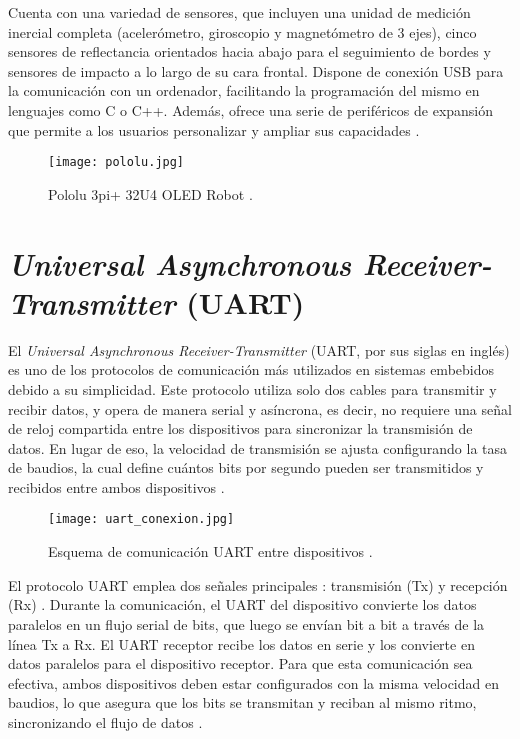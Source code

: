 Cuenta con una variedad de sensores, que incluyen una unidad de medición inercial completa (acelerómetro, giroscopio y magnetómetro de 3 ejes), cinco sensores de reflectancia orientados hacia abajo para el seguimiento de bordes y sensores de impacto a lo largo de su cara frontal. Dispone de conexión USB para la comunicación con un ordenador, facilitando la programación del mismo en lenguajes como C o C++. Además, ofrece una serie de periféricos de expansión que permite a los usuarios personalizar y ampliar sus capacidades \cite{pololu}.
\begin{figure}[H]
	\centering
	\texttt{[image: pololu.jpg]}
	\caption{Pololu 3pi+ 32U4 OLED Robot \cite{pololu}.}
	\label{fig:pololu}
\end{figure}

\section{\textit{Universal Asynchronous Receiver-Transmitter} (UART)}

El \textit{Universal Asynchronous Receiver-Transmitter} (UART, por sus siglas en inglés) es uno de los protocolos de comunicación más utilizados en sistemas embebidos debido a su simplicidad. Este protocolo utiliza solo dos cables para transmitir y recibir datos, y opera de manera serial y asíncrona, es decir, no requiere una señal de reloj compartida entre los dispositivos para sincronizar la transmisión de datos. En lugar de eso, la velocidad de transmisión se ajusta configurando la tasa de baudios, la cual define cuántos bits por segundo pueden ser transmitidos y recibidos entre ambos dispositivos \cite{pena_uart_nodate}.

\begin{figure}[H]
	\centering
	\texttt{[image: uart\_conexion.jpg]}
	\caption{Esquema de comunicación UART entre dispositivos \cite{pena_uart_nodate}.}
	\label{fig:uart_conexión}
\end{figure}

El protocolo UART emplea dos señales principales : transmisión (Tx) y recepción (Rx) . Durante la comunicación, el UART del dispositivo convierte los datos paralelos en un flujo serial de bits, que luego se envían bit a bit a través de la línea Tx a Rx. El UART receptor recibe los datos en serie y los convierte en datos paralelos para el dispositivo receptor. Para que esta comunicación sea efectiva, ambos dispositivos deben estar configurados con la misma velocidad en baudios, lo que asegura que los bits se transmitan y reciban al mismo ritmo, sincronizando el flujo de datos \cite{campbell_basics_2016}.


